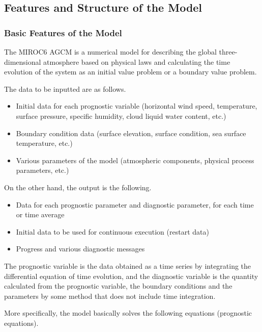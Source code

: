 \hypertarget{features-and-structure-of-the-model}{%
\subsection{Features and Structure of the
Model}\label{features-and-structure-of-the-model}}

\hypertarget{basic-features-of-the-model}{%
\subsubsection{Basic Features of the
Model}\label{basic-features-of-the-model}}

The MIROC6 AGCM is a numerical model for describing the global
three-dimensional atmosphere based on physical laws and calculating the
time evolution of the system as an initial value problem or a boundary
value problem.

The data to be inputted are as follows.

\begin{itemize}
\item
  Initial data for each prognostic variable (horizontal wind speed,
  temperature, surface pressure, specific humidity, cloud liquid water
  content, etc.)
\item
  Boundary condition data (surface elevation, surface condition, sea
  surface temperature, etc.)
\item
  Various parameters of the model (atmospheric components, physical
  process parameters, etc.)
\end{itemize}

On the other hand, the output is the following.

\begin{itemize}
\item
  Data for each prognostic parameter and diagnostic parameter, for each
  time or time average
\item
  Initial data to be used for continuous execution (restart data)
\item
  Progress and various diagnostic messages
\end{itemize}

The prognostic variable is the data obtained as a time series by
integrating the differential equation of time evolution, and the
diagnostic variable is the quantity calculated from the prognostic
variable, the boundary conditions and the parameters by some method that
does not include time integration.

More specifically, the model basically solves the following equations
(prognostic equations).

